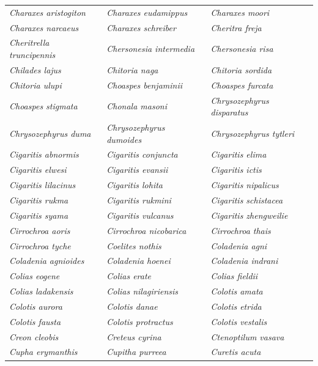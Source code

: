 \documentclass[runningheads]{llncs}
\begin{document}
\begin{longtable}{lll}
\textit{Charaxes aristogiton} & \textit{Charaxes eudamippus} & \textit{Charaxes moori} \\
\textit{Charaxes narcaeus} & \textit{Charaxes schreiber} & \textit{Cheritra freja} \\
\textit{Cheritrella truncipennis} & \textit{Chersonesia intermedia} & \textit{Chersonesia risa} \\
\textit{Chilades lajus} & \textit{Chitoria naga} & \textit{Chitoria sordida} \\
\textit{Chitoria ulupi} & \textit{Choaspes benjaminii} & \textit{Choaspes furcata} \\
\textit{Choaspes stigmata} & \textit{Chonala masoni} & \textit{Chrysozephyrus disparatus} \\
\textit{Chrysozephyrus duma} & \textit{Chrysozephyrus dumoides} & \textit{Chrysozephyrus tytleri} \\
\textit{Cigaritis abnormis} & \textit{Cigaritis conjuncta} & \textit{Cigaritis elima} \\
\textit{Cigaritis elwesi} & \textit{Cigaritis evansii} & \textit{Cigaritis ictis} \\
\textit{Cigaritis lilacinus} & \textit{Cigaritis lohita} & \textit{Cigaritis nipalicus} \\
\textit{Cigaritis rukma} & \textit{Cigaritis rukmini} & \textit{Cigaritis schistacea} \\
\textit{Cigaritis syama} & \textit{Cigaritis vulcanus} & \textit{Cigaritis zhengweilie} \\
\textit{Cirrochroa aoris} & \textit{Cirrochroa nicobarica} & \textit{Cirrochroa thais} \\
\textit{Cirrochroa tyche} & \textit{Coelites nothis} & \textit{Coladenia agni} \\
\textit{Coladenia agnioides} & \textit{Coladenia hoenei} & \textit{Coladenia indrani} \\
\textit{Colias eogene} & \textit{Colias erate} & \textit{Colias fieldii} \\
\textit{Colias ladakensis} & \textit{Colias nilagiriensis} & \textit{Colotis amata} \\
\textit{Colotis aurora} & \textit{Colotis danae} & \textit{Colotis etrida} \\
\textit{Colotis fausta} & \textit{Colotis protractus} & \textit{Colotis vestalis} \\
\textit{Creon cleobis} & \textit{Creteus cyrina} & \textit{Ctenoptilum vasava} \\
\textit{Cupha erymanthis} & \textit{Cupitha purreea} & \textit{Curetis acuta} \\

\end{longtable}
\end{document}
